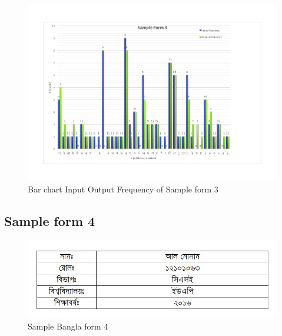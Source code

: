 \begin{figure}[H]
\centering
\includegraphics[width=1\textwidth]{Bform3.pdf}
\caption {Bar chart Input Output Frequency of Sample form 3}
\label {fig:Bbar3}
\end{figure}



\subsection{Sample form 4}
\begin{figure}[H]
\centering
\includegraphics[width=1\textwidth]{formBen04.JPG}
\caption {Sample Bangla form 4}
\label {fig:FormBan4}
\end{figure}

